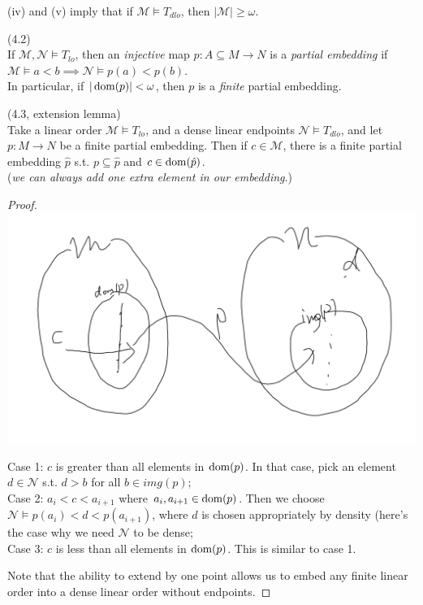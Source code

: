 \documentclass[a4paper]{article}
\begin{document}
\begin{rem}
    (iv) and (v) imply that if $\mathcal{M} \vDash T_{dlo}$, then $|\mathcal{M}| \geq \omega$.
\end{rem}

\begin{defi} (4.2)\\
    If $\mathcal{M},\mathcal{N} \vDash T_{lo}$, then an \emph{injective} map $p:A \subseteq M \to N$ is a \emph{partial embedding} if $\mathcal{M} \vDash a<b \implies \mathcal{N} \vDash p(a) < p(b)$.\\
    In particular, if $|\operatorname{dom}(p)| < \omega$, then $p$ is a \emph{finite} partial embedding.
\end{defi}

\begin{lemma} (4.3, extension lemma)\\
    Take a linear order $\mathcal{M} \vDash T_{lo}$, and a dense linear endpoints $\mathcal{N} \vDash T_{dlo}$, and let $p: M \to N$ be a finite partial embedding. Then if $c \in \mathcal{M}$, there is a finite partial embedding $\hat{p}$ s.t. $p \subseteq \hat{p}$ and $c \in \operatorname{dom}(\hat{p})$.\\
    (\emph{we can always add one extra element in our embedding}.)
    \begin{proof}
        \includegraphics[scale=0.5]{image/Model_03.png}

        Case 1: $c$ is greater than all elements in $\operatorname{dom}(p)$. In that case, pick an element $d \in \mathcal{N}$ s.t. $d>b$ for all $b \in img(p)$;\\
        Case 2: $a_i<c<a_{i+1}$ where $a_i,a_{i+1} \in \operatorname{dom}(p)$. Then we choose $\mathcal{N} \vDash p(a_i) < d < p(a_{i+1})$, where $d$ is chosen appropriately by density (here's the case why we need $\mathcal{N}$ to be dense;\\
        Case 3: $c$ is less than all elements in $\operatorname{dom}(p)$. This is similar to case 1.

        Note that the ability to extend by one point allows us to embed any finite linear order into a dense linear order without endpoints.
    \end{proof}
\end{lemma}
\end{document}
